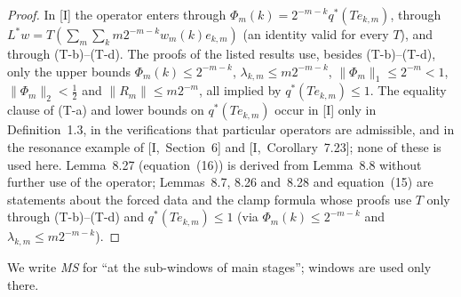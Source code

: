 \documentclass[10pt]{amsart}
\theoremstyle{definition}
\theoremstyle{remark}
\begin{document}
\begin{proof}
In [I] the operator enters through $\Phi_m(k)=2^{-m-k}q^*(Te_{k,m})$, through
$L^*w=T(\sum_m\sum_km2^{-m-k}w_m(k)e_{k,m})$ (an identity valid for every $T$),
and through (T-b)--(T-d).  The proofs of the listed results use, besides
(T-b)--(T-d), only the upper bounds $\Phi_m(k)\le2^{-m-k}$, $\lambda_{k,m}\le
m2^{-m-k}$, $\|\Phi_m\|_1\le2^{-m}<1$, $\|\Phi_m\|_2<\frac12$ and $\|R_m\|\le
m2^{-m}$, all implied by $q^*(Te_{k,m})\le1$.  The equality clause of (T-a)
and lower bounds on $q^*(Te_{k,m})$ occur in [I] only in
Definition~1.3, in the verifications that particular operators are
admissible, and in the resonance example of [I,~Section~6] and
[I,~Corollary~7.23]; none of these is used here.  Lemma~8.27 (equation~(16))
is derived from Lemma~8.8 without further use of the operator; Lemmas~8.7,
8.26 and~8.28 and equation~(15) are statements about the forced data and
the clamp formula whose proofs use $T$ only through (T-b)--(T-d) and
$q^*(Te_{k,m})\le1$ (via $\Phi_m(k)\le2^{-m-k}$ and
$\lambda_{k,m}\le m2^{-m-k}$).
\end{proof}

We write \emph{MS} for ``at the sub-windows of main stages''; windows are used
only there.
\end{document}

